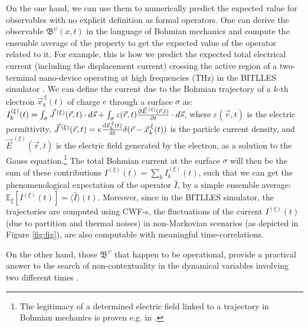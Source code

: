 \documentclass[11pt, a4paper]{article} %
\newcommand{\B}{\mathfrak{B}}
\begin{document}
On the one hand, we can use them to numerically predict the expected value for observables with no explicit definition as formal operators. One can derive the observable $\B^\psi(x,t)$ in the language of Bohmian mechanics and compute the ensemble average of the property to get the expected value of the operator related to it. For example, this is how we predict the expected total electrical current (including the displacement current) crossing the active region of a two-terminal nano-device operating at high frequencies (THz) in the BITLLES simulator \cite{equiv, Pel}. We can define the current due to the Bohmian trajectory of a $k$-th electron $\vec{x}_k^{\:\xi}(t)$ of charge $e$ through a surface $\sigma$ as: $I_k^{(\xi)}(t)=\int_\sigma \vec{J}^{\:(\xi)}(\vec{r},t)\cdot d\vec{s}+\int_\sigma \varepsilon(\vec{r},t)\pdv{\vec{E}^{\:(\xi)}(\vec{r},t)}{t}\cdot d\vec{s}$, where $\varepsilon(\vec{r},t)$ is the electric permittivity, $\vec{J}^{\:(\xi)}(\vec{r},t)=e\dv{\vec{x}_k^{\:\xi}(t)}{t}\delta(\vec{r}-\vec{x}_k^{\:\xi}(t))$ is the particle current density, and $\vec{E}^{\:(\xi)}(\vec{r},t)$ is the electric field generated by the electron, as a solution to the Gauss equation.\footnote{The legitimacy of a determined electric field linked to a trajectory in Bohmian mechanics is proven e.g. in \cite{lightMatter}.} The total Bohmian current at the surface $\sigma$ will then be the sum of these contributions $I^{(\xi)}(t)=\sum_k I^{(\xi)}_k(t)$, such that we can get the phenomenological expectation of the operator $\hat{I}$, by a simple ensemble average: $\mathbb{E}_\xi [I^{(\xi)}(t)]=\langle \hat{I}\rangle(t)$. Moreover, since in the BITLLES simulator, the trajectories are computed using CWF-s, the fluctuations of the current $I^{(\xi)}(t)$ (due to partition and thermal noises) in non-Markovian scenarios (as depicted in Figure \ref{fig:fig}), are also computable with meaningful time-correlations.

On the other hand, those $\B^\psi$ that happen to be operational, provide a practical answer to the search of non-contextuality in the dynamical variables involving two different times \cite{DevInPosition1}. 
\end{document}
